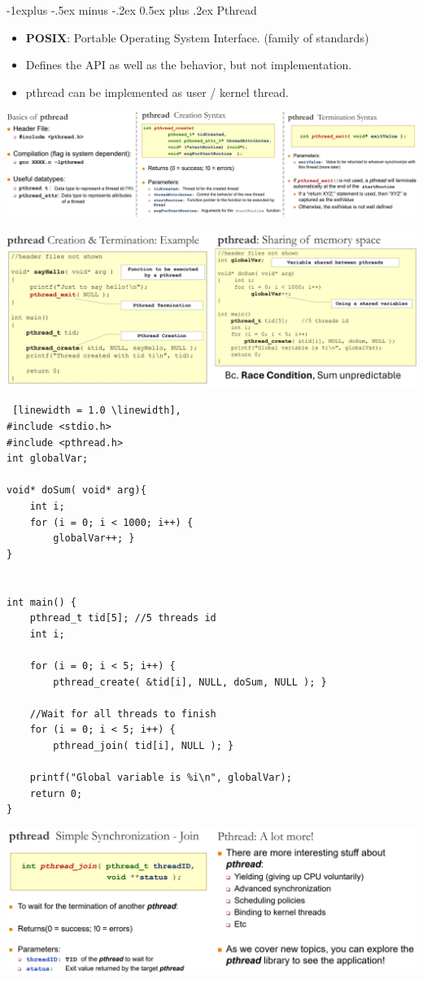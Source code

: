 \documentclass[10pt, landscape]{article}
\makeatletter
\renewcommand{\subsection}{\@startsection{subsection}{2}{0mm}%
                                {-1explus -.5ex minus -.2ex}%
                                {0.5ex plus .2ex}%
                                {\normalfont\normalsize\bfseries}}
\makeatother
\begin{document}
\begin{multicols*}{3}
\subsection{Pthread}
\begin{itemize}
\item \textbf{POSIX}: Portable Operating System Interface. (family of standards)
\item Defines the API as well as the behavior, but not implementation.
\item pthread can be implemented as user / kernel thread.
\end{itemize}

\centerline{\includegraphics[width=1\linewidth]{pthreadBasics}}
\medskip
\centerline{\includegraphics[width=1\linewidth]{pthreadExample}}

\begin{lstlisting} [linewidth = 1.0 \linewidth],
#include <stdio.h>
#include <pthread.h>
int globalVar;

void* doSum( void* arg){ 
    int i;
    for (i = 0; i < 1000; i++) {
        globalVar++; }
}


int main() {
    pthread_t tid[5]; //5 threads id
    int i;

    for (i = 0; i < 5; i++) {
        pthread_create( &tid[i], NULL, doSum, NULL ); }

    //Wait for all threads to finish
    for (i = 0; i < 5; i++) {
        pthread_join( tid[i], NULL ); }

    printf("Global variable is %i\n", globalVar);
    return 0;
}
\end{lstlisting}

\centerline{\includegraphics[width=1\linewidth]{pthreadSync}}


\end{multicols*}
\end{document}
